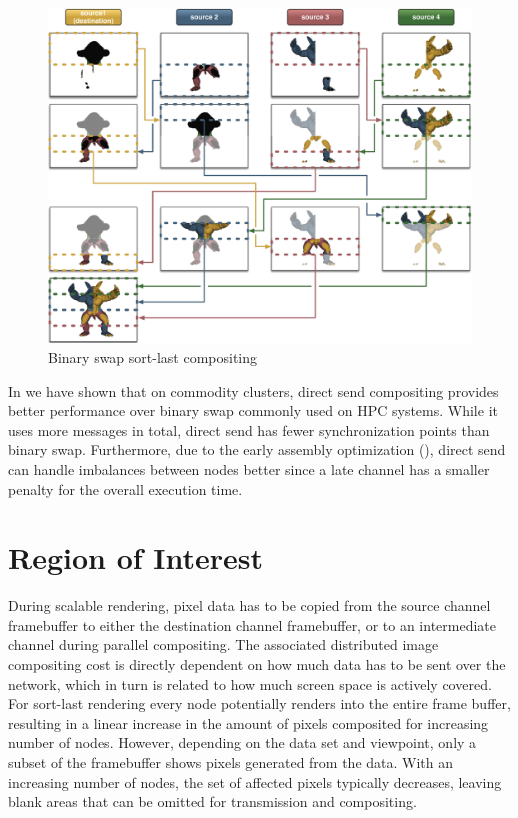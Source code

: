 \begin{figure}[h!t]\center
 \includegraphics[width=0.9\columnwidth]{images/binarySwap}
 {\caption{\label{fBS}Binary swap sort-last compositing}}
\end{figure}

In \cite{EP:07} we have shown that on commodity clusters, direct send
compositing provides better performance over binary swap commonly used on HPC
systems. While it uses more messages in total, direct send has fewer
synchronization points than binary swap. Furthermore, due to the early assembly
optimization (), direct send can handle imbalances between
nodes better since a late channel has a smaller penalty for the overall
execution time.


\section{Region of Interest}

During scalable rendering, pixel data has to be copied from the source channel
framebuffer to either the destination channel framebuffer, or to an
intermediate channel during parallel compositing. The associated distributed
image compositing cost is directly dependent on how much data has to be sent
over the network, which in turn is related to how much screen space is actively
covered. For sort-last rendering every node potentially renders into the entire
frame buffer, resulting in a linear increase in the amount of pixels composited
for increasing number of nodes. However, depending on the data set and
viewpoint, only a subset of the framebuffer shows pixels generated from the
data. With an increasing number of nodes, the set of affected pixels typically
decreases, leaving blank areas that can be omitted for transmission and
compositing.

